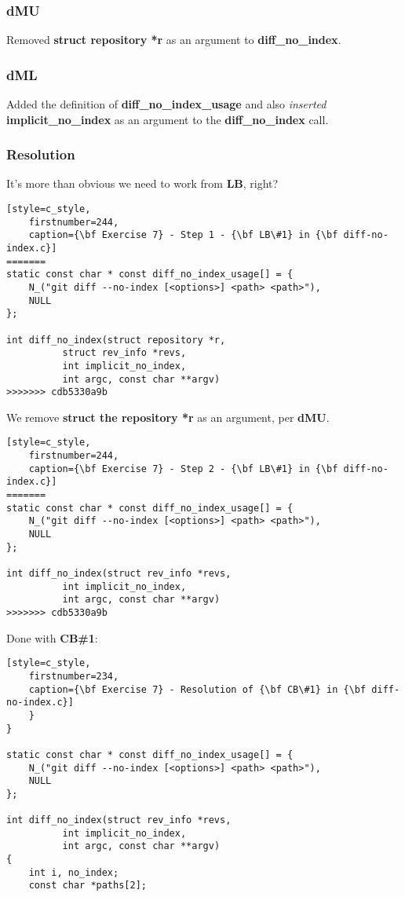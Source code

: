 \subsubsection*{dMU}
Removed {\bf struct repository *r} as an argument to {\bf diff\_no\_index}.

\subsubsection*{dML}
Added the definition of {\bf diff\_no\_index\_usage} and also {\it inserted} {\bf implicit\_no\_index} as an argument to
the {\bf diff\_no\_index} call.

\subsubsection*{Resolution}
It's more than obvious we need to work from {\bf LB}, right?

\begin{lstlisting}[style=c_style,
	firstnumber=244,
	caption={\bf Exercise 7} - Step 1 - {\bf LB\#1} in {\bf diff-no-index.c}]
=======
static const char * const diff_no_index_usage[] = {
	N_("git diff --no-index [<options>] <path> <path>"),
	NULL
};

int diff_no_index(struct repository *r,
		  struct rev_info *revs,
		  int implicit_no_index,
		  int argc, const char **argv)
>>>>>>> cdb5330a9b
\end{lstlisting}

We remove {\bf struct the repository *r} as an argument, per {\bf dMU}.

\begin{lstlisting}[style=c_style,
	firstnumber=244,
	caption={\bf Exercise 7} - Step 2 - {\bf LB\#1} in {\bf diff-no-index.c}]
=======
static const char * const diff_no_index_usage[] = {
	N_("git diff --no-index [<options>] <path> <path>"),
	NULL
};

int diff_no_index(struct rev_info *revs,
		  int implicit_no_index,
		  int argc, const char **argv)
>>>>>>> cdb5330a9b
\end{lstlisting}

Done with {\bf CB\#1}:

\begin{lstlisting}[style=c_style,
	firstnumber=234,
	caption={\bf Exercise 7} - Resolution of {\bf CB\#1} in {\bf diff-no-index.c}]
	}
}

static const char * const diff_no_index_usage[] = {
	N_("git diff --no-index [<options>] <path> <path>"),
	NULL
};

int diff_no_index(struct rev_info *revs,
		  int implicit_no_index,
		  int argc, const char **argv)
{
	int i, no_index;
	const char *paths[2];
\end{lstlisting}

